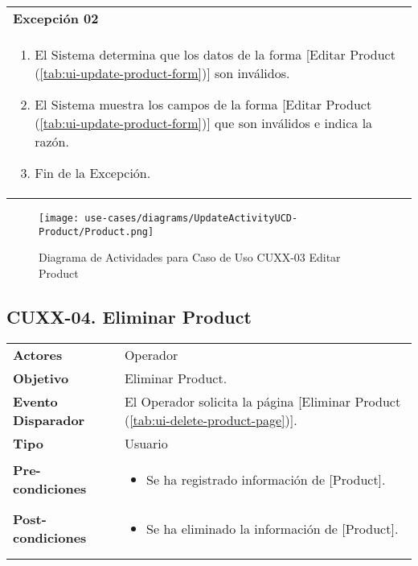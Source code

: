 	\begin{tabular}{ p{15.5cm} }
		\textbf{Excepci\'on 02} \\
		\begin{enumerate}
			\item El Sistema determina que los datos de la forma [Editar Product (\ref{tab:ui-update-product-form})] son inv\'alidos.
			\item El Sistema muestra los campos de la forma [Editar Product (\ref{tab:ui-update-product-form})] que son inv\'alidos e indica la raz\'on.
			\item Fin de la Excepci\'on.
		\end{enumerate}
	\end{tabular}
	
	\begin{figure}[H]
		\begin{center}
		 \label{tab:activity-update-ucd-entity-product}
		 \texttt{[image: use-cases/diagrams/UpdateActivityUCD-Product/Product.png]}
		 \caption{Diagrama de Actividades para Caso de Uso CUXX-03 Editar Product}
		\end{center}
	\end{figure}
	
	\clearpage
	\subsection{CUXX-04. Eliminar Product} \label{sec:cu-delete-Product}
	
	\begin{tabular}{ p{3.5cm} p{11.5cm} }
		\textbf{Actores} & Operador\\
		\textbf{Objetivo} & Eliminar Product.\\
		\textbf{Evento Disparador} & El Operador solicita la p\'agina [Eliminar Product (\ref{tab:ui-delete-product-page})].\\
		\textbf{Tipo} & Usuario\\
		\textbf{Pre-condiciones} &
			\begin{minipage}[t]{0.6\textwidth}
			\begin{itemize}[noitemsep,nolistsep]
			\setlength{\itemindent}{-.5cm}
				\item Se ha registrado informaci\'on de [Product].
			\end{itemize}
			\end{minipage} \\
		\textbf{Post-condiciones} &
			\begin{minipage}[t]{0.6\textwidth}
			\begin{itemize}[noitemsep,nolistsep]
			\setlength{\itemindent}{-.5cm}
				\item Se ha eliminado la informaci\'on de [Product].
			\end{itemize}
			\end{minipage} \\
		\\
	\end{tabular}
	

